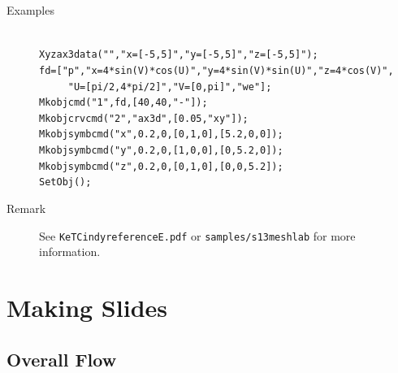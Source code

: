 \documentclass[papersize,a4paper,12pt]{article}
\begin{document}
\begin{description}
\item[Examples]\mbox{}\\
\verb|Xyzax3data("","x=[-5,5]","y=[-5,5]","z=[-5,5]");|\\
\verb|fd=["p","x=4*sin(V)*cos(U)","y=4*sin(V)*sin(U)","z=4*cos(V)",|\\
\verb|     "U=[pi/2,4*pi/2]","V=[0,pi]","we"];|\\
\verb|Mkobjcmd("1",fd,[40,40,"-"]);|\\
\verb|Mkobjcrvcmd("2","ax3d",[0.05,"xy"]);|\\
\verb|Mkobjsymbcmd("x",0.2,0,[0,1,0],[5.2,0,0]);|\\
\verb|Mkobjsymbcmd("y",0.2,0,[1,0,0],[0,5.2,0]);|\\
\verb|Mkobjsymbcmd("z",0.2,0,[0,1,0],[0,0,5.2]);|\\
\verb|SetObj();|
\item[Remark]See \verb|KeTCindyreferenceE.pdf| or \verb|samples/s13meshlab| for more information.
\end{description}


\newpage

\section{Making Slides}

\subsection{Overall Flow}
\end{document}

